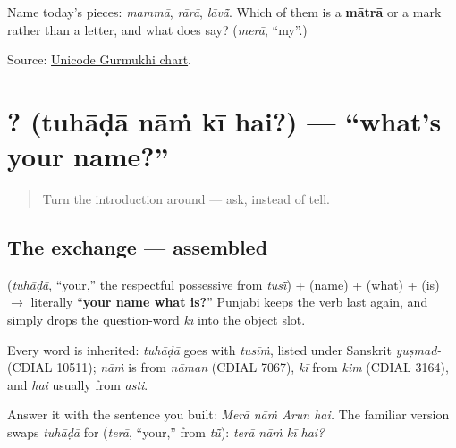 \begin{tcolorbox}[breakable,colback=teal!4,colframe=teal!35!black,title={Before you move on}]
Name today's pieces: \emph{mammā}, \emph{rārā}, \emph{lāvā̃}. Which of them is a \textbf{mātrā} or a mark rather than a letter, and what does \textbf{} say? (\emph{merā}, “my”.)

Source: \href{https://www.unicode.org/charts/PDF/U0A00.pdf}{Unicode Gurmukhi chart}.
\end{tcolorbox}
\section[\texorpdfstring{\pa{ਤੁਹਾਡਾ} \pa{ਨਾਂ} \pa{ਕੀ} \pa{ਹੈ}? (tuhāḍā nāṁ kī hai?)}{ਤੁਹਾਡਾ ਨਾਂ ਕੀ ਹੈ? (tuhāḍā nāṁ kī hai?)}]{   ? (tuhāḍā nāṁ kī hai?) — \textquotedblleft{}what's your name?\textquotedblright{}}

\label{lesson:PA-C02-tuhada-naam-ki-hai}



\begin{quote}
Turn the introduction around — ask, instead of tell.
\end{quote}

\subsection*{The exchange — assembled}
\textbf{} (\emph{tuhāḍā}, \textquotedblleft{}your,\textquotedblright{} the respectful possessive from \emph{tusī̃}) + \textbf{} (name) + \textbf{} (what) + \textbf{} (is) $\to$ literally \textquotedblleft{}\textbf{your name what is?}\textquotedblright{} Punjabi keeps the verb last again, and simply drops the question-word \emph{kī} into the object slot.

\begin{cousinweb}
Every word is inherited: \emph{tuhāḍā} goes with \emph{tusīṁ}, listed under Sanskrit \emph{yuṣmad-} (CDIAL 10511); \emph{nāṁ} is from \emph{nāman} (CDIAL 7067), \emph{kī} from \emph{kim} (CDIAL 3164), and \emph{hai} usually from \emph{asti}.
\end{cousinweb}

\begin{grammarlens}[title={Grammar Lens: answering}]
Answer it with the sentence you built: \emph{Merā nāṁ Arun hai.} The familiar version swaps \emph{tuhāḍā} for \textbf{} (\emph{terā}, \textquotedblleft{}your,\textquotedblright{} from \emph{tū̃}): \emph{terā nāṁ kī hai?}
\end{grammarlens}

